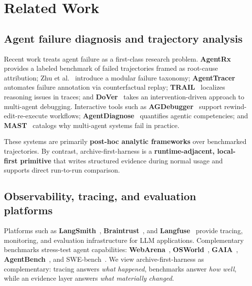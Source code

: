 \documentclass[11pt]{article}
\begin{document}
\section{Related Work}

\subsection{Agent failure diagnosis and trajectory analysis}

Recent work treats agent failure as a first-class research problem. \textbf{AgentRx}~\cite{barke2026agentrx} provides a labeled benchmark of failed trajectories framed as root-cause attribution; Zhu et al.~\cite{zhu2025agentdebug} introduce a modular failure taxonomy; \textbf{AgentTracer}~\cite{li2025agentracer} automates failure annotation via counterfactual replay; \textbf{TRAIL}~\cite{rao2025trail} localizes reasoning issues in traces; and \textbf{DoVer}~\cite{ma2025dover} takes an intervention-driven approach to multi-agent debugging. Interactive tools such as \textbf{AGDebugger}~\cite{epperson2025debugging} support rewind-edit-re-execute workflows; \textbf{AgentDiagnose}~\cite{ou2025agentdiagnose} quantifies agentic competencies; and \textbf{MAST}~\cite{cemri2025mast} catalogs why multi-agent systems fail in practice.

These systems are primarily \textbf{post-hoc analytic frameworks} over benchmarked trajectories. By contrast, archive-first-harness is a \textbf{runtime-adjacent, local-first primitive} that writes structured evidence during normal usage and supports direct run-to-run comparison.

\subsection{Observability, tracing, and evaluation platforms}

Platforms such as \textbf{LangSmith}~\cite{langsmith}, \textbf{Braintrust}~\cite{braintrust}, and \textbf{Langfuse}~\cite{langfuse} provide tracing, monitoring, and evaluation infrastructure for LLM applications. Complementary benchmarks stress-test agent capabilities: \textbf{WebArena}~\cite{zhou2024webarena}, \textbf{OSWorld}~\cite{xie2024osworld}, \textbf{GAIA}~\cite{mialon2024gaia}, \textbf{AgentBench}~\cite{liu2024agentbench}, and SWE-bench~\cite{jimenez2024swebench}. We view archive-first-harness as complementary: tracing answers \emph{what happened}, benchmarks answer \emph{how well}, while an evidence layer answers \emph{what materially changed}.
\end{document}
